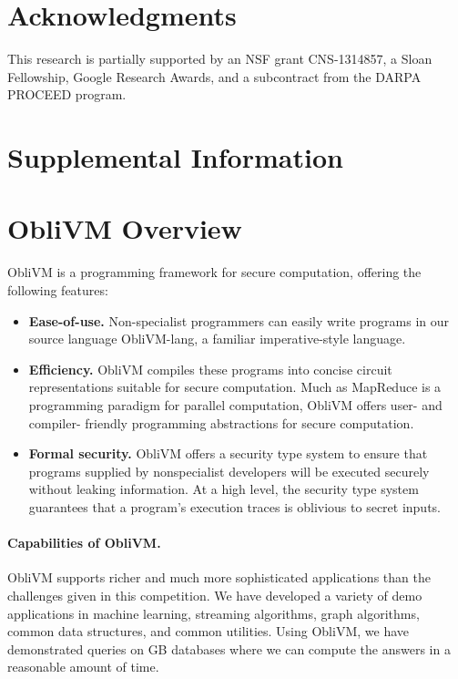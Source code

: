 \documentclass[11pt]{article}
\begin{document}


\section*{Acknowledgments}
This research is partially supported 
by an NSF grant CNS-1314857, a Sloan Fellowship, 
Google Research Awards, 
and a subcontract from the DARPA PROCEED program.

\newpage
\appendix

\section*{\Large Supplemental Information}
\section{{\sf ObliVM} Overview}

{\sf ObliVM} is a programming framework for secure computation, offering the 
following features:
\begin{itemize}
\item
{\bf Ease-of-use.} Non-specialist programmers can easily 
write programs in our source language {\sf ObliVM-lang}, a 
familiar imperative-style language.
\item
{\bf Efficiency.} {\sf ObliVM} compiles these programs into 
concise circuit representations suitable for secure computation. 
Much as MapReduce is a programming paradigm for 
parallel computation, {\sf ObliVM} offers user- and compiler- friendly
programming abstractions for secure computation.
\item
{\bf Formal security.}
{\sf ObliVM} offers a security type system to ensure 
that programs supplied by nonspecialist developers
will be executed securely without leaking information.
At a high level, the security type system guarantees
that a program's execution traces 
is oblivious to secret inputs.
\end{itemize}

\paragraph{Capabilities of {\sf ObliVM}.} 
{\sf ObliVM} supports richer and much more sophisticated applications
than the challenges given in this competition.
We have developed a variety of demo applications in machine learning,
streaming algorithms, graph algorithms, 
common data structures, and common utilities.
Using {\sf ObliVM}, we have demonstrated queries on {\sf GB} 
databases where we can compute the answers in a reasonable amount of time. 
\end{document}

